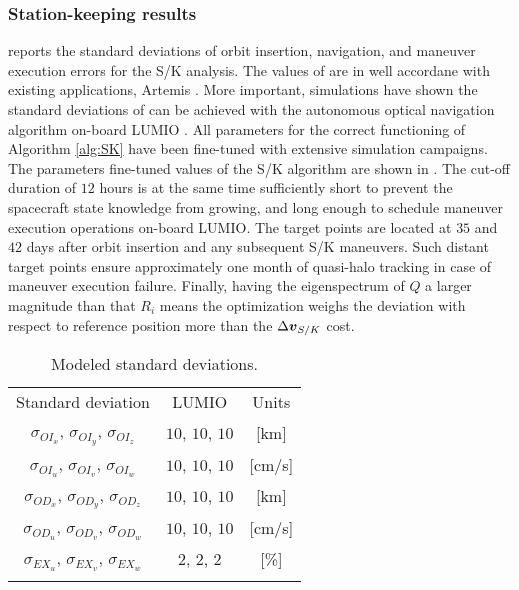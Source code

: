 \subsubsection{Station-keeping results}\label{subsubsec:S/K results}
 reports the standard deviations of orbit insertion, navigation, and maneuver execution errors for the S/K analysis. The values of  are in well accordane with existing applications, \eg Artemis \cite{folta2014artemis}. More important, simulations have shown the standard deviations of  can be achieved with the autonomous optical navigation algorithm on-board LUMIO \cite{franzese2018NavSciTech}. All parameters for the correct functioning of Algorithm \ref{alg:SK} have been fine-tuned with extensive simulation campaigns. The parameters fine-tuned values of the S/K algorithm are shown in . The cut-off duration of $12$ hours is at the same time sufficiently short to prevent the spacecraft state knowledge from growing, and long enough to schedule maneuver execution operations on-board LUMIO. The target points are located at $35$ and $42$ days after orbit insertion and any subsequent S/K maneuvers. Such distant target points ensure approximately one month of quasi-halo tracking in case of maneuver execution failure. Finally, having the eigenspectrum of $Q$ a larger magnitude than that $R_i$ means the optimization weighs the deviation with respect to reference position more than the $\Delta\boldsymbol{v}_{S/K}$ cost.
%
\begin{table}[b!]
	\centering
		\caption{Modeled standard deviations.}
		\label{tab:SKUncertainties}
		\centering
		\begin{tabular}{ccc}
			\TOPlines
			Standard deviation & LUMIO & Units \\ 
			\MIDline				$\sigma_{OI_x}$, $\sigma_{OI_y}$, $\sigma_{OI_z}$ & $10$, $10$, $10$ & [km] \\
			$\sigma_{OI_u}$, $\sigma_{OI_v}$, $\sigma_{OI_w}$ & $10$, $10$, $10$ & [cm/s] \\
			$\sigma_{OD_x}$, $\sigma_{OD_y}$, $\sigma_{OD_z}$ & $10$, $10$, $10$ & [km] \\
			$\sigma_{OD_u}$, $\sigma_{OD_v}$, $\sigma_{OD_w}$ & $10$, $10$, $10$ & [cm/s] \\
			$\sigma_{EX_u}$, $\sigma_{EX_v}$, $\sigma_{EX_w}$ & $2$, $2$, $2$ & [\%] \\
			\BOTTOMlines
		\end{tabular}
\end{table}
